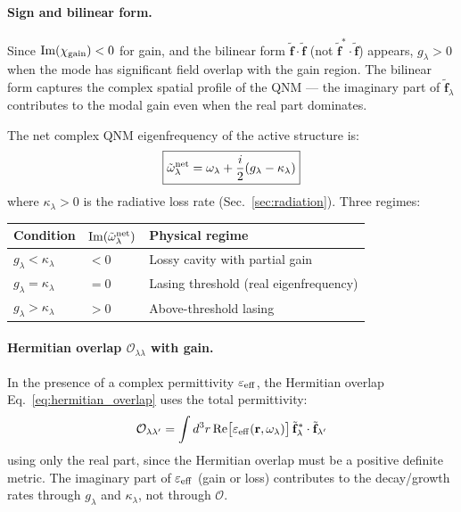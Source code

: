 \documentclass[12pt]{article}
\newcommand{\tf}{\tilde{\mathbf{f}}}
\newcommand{\tomega}{\tilde{\omega}}
\begin{document}
\paragraph{Sign and bilinear form.}
Since $\mathrm{Im}(\chi_{\rm gain}) < 0$ for gain, and the bilinear form
$\tf\cdot\tf$ (not $\tf^*\cdot\tf$) appears, $g_\lambda > 0$ when the
mode has significant field overlap with the gain region.  The bilinear
form captures the complex spatial profile of the QNM --- the imaginary
part of $\tf_\lambda$ contributes to the modal gain even when the
real part dominates.

The net complex QNM eigenfrequency of the active structure is:
\begin{equation}
  \boxed{
  \tomega_\lambda^{\rm net} = \omega_\lambda + \frac{i}{2}(g_\lambda - \kappa_\lambda)
  }
  \label{eq:net_freq}
\end{equation}
where $\kappa_\lambda > 0$ is the radiative loss rate (Sec.~\ref{sec:radiation}).
Three regimes:

\begin{center}
\begin{tabular}{lll}
\toprule
Condition & $\mathrm{Im}(\tomega_\lambda^{\rm net})$ & Physical regime\\
\midrule
$g_\lambda < \kappa_\lambda$ & $< 0$ & Lossy cavity with partial gain\\
$g_\lambda = \kappa_\lambda$ & $= 0$ & Lasing threshold (real eigenfrequency)\\
$g_\lambda > \kappa_\lambda$ & $> 0$ & Above-threshold lasing\\
\bottomrule
\end{tabular}
\end{center}

\paragraph{Hermitian overlap $\mathcal{O}_{\lambda\lambda}$ with gain.}
In the presence of a complex permittivity $\varepsilon_{\rm eff}$, the
Hermitian overlap Eq.~\eqref{eq:hermitian_overlap} uses the total
permittivity:
\begin{equation}
  \mathcal{O}_{\lambda\lambda'} =
  \int d^3r\,\mathrm{Re}\bigl[\varepsilon_{\rm eff}(\mathbf{r},\omega_\lambda)\bigr]\,
  \tf_\lambda^*\cdot\tf_{\lambda'}
  \label{eq:hermitian_overlap_gain}
\end{equation}
using only the real part, since the Hermitian overlap must be a positive
definite metric.  The imaginary part of $\varepsilon_{\rm eff}$ (gain or loss)
contributes to the decay/growth rates through $g_\lambda$ and $\kappa_\lambda$,
not through $\mathcal{O}$.
\end{document}
